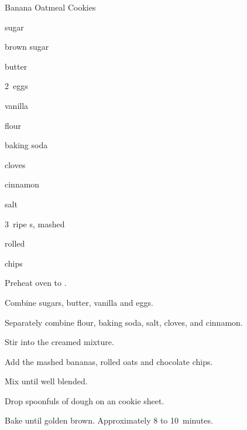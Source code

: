 \begin{recipe}{Banana Oatmeal Cookies}{}{}

\begin{ingredients}
\item \C{\half} sugar
\item \C{\half} brown sugar
\item {} butter
\item 2~eggs
\item {} vanilla
\item {} flour
\item {} baking soda
\item \tp{\half} cloves
\item {} cinnamon
\item \tp{\eighth} salt
\item 3~ripe s, mashed
\item {} rolled 
\item {}  chips
\end{ingredients}

\begin{directions}
\item Preheat oven to .
\item Combine sugars, butter, vanilla and eggs.
\item Separately combine flour, baking soda, salt, cloves, and cinnamon.
\item Stir into the creamed mixture.
\item Add the mashed bananas, rolled oats and chocolate chips.
\item Mix until well blended.
\item Drop spoonfuls of dough on an cookie sheet.
\item Bake until golden brown. Approximately 8 to 10~minutes.
\end{directions}
\end{recipe}
